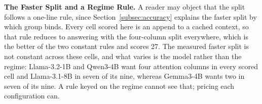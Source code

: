 \textbf{The Faster Split and a Regime Rule.}
A reader may object that the split follows a one-line rule, since Section~\ref{subsec:accuracy} explains the faster split by which group binds.
Every cell scored here is an append to a cached context, so that rule reduces to answering with the four-column split everywhere, which is the better of the two constant rules and scores 27.
The measured faster split is not constant across these cells, and what varies is the model rather than the regime: Llama-3.2-1B and Qwen3-4B want four attention columns in every scored cell and Llama-3.1-8B in seven of its nine, whereas Gemma3-4B wants two in seven of its nine.
A rule keyed on the regime cannot see that; pricing each configuration can.

